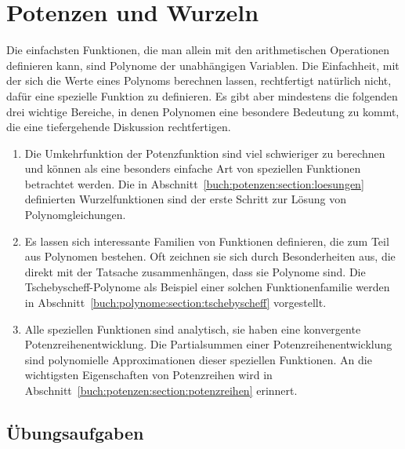 %
%
%
\chapter{Potenzen und Wurzeln
\label{buch:chapter:potenzen}}
Die einfachsten Funktionen, die man allein mit den arithmetischen
Operationen definieren kann, sind Polynome der unabhängigen Variablen.
Die Einfachheit, mit der sich die Werte eines Polynoms berechnen lassen,
rechtfertigt natürlich nicht, dafür eine spezielle Funktion zu definieren.
Es gibt aber mindestens die folgenden drei wichtige Bereiche, in denen
Polynomen eine besondere Bedeutung zu kommt, die eine tiefergehende
Diskussion rechtfertigen.
\begin{enumerate}
\item
Die Umkehrfunktion der Potenzfunktion sind viel schwieriger zu 
%
berechnen und können als eine besonders einfache Art von speziellen
Funktionen betrachtet werden.
Die in Abschnitt~\ref{buch:potenzen:section:loesungen} definierten
Wurzelfunktionen sind der erste Schritt zur Lösung von Polynomgleichungen.
%
%
\item
Es lassen sich interessante Familien von Funktionen
definieren, die zum Teil aus Polynomen bestehen.
Oft zeichnen sie sich durch Besonderheiten aus, die
direkt mit der Tatsache zusammenhängen, dass sie Polynome sind.
Die Tschebyscheff-Polynome als
Beispiel einer solchen Funktionenfamilie werden in
Abschnitt~\ref{buch:polynome:section:tschebyscheff} vorgestellt.
\item
Alle speziellen Funktionen sind analytisch, sie haben eine konvergente
Potenzreihenentwicklung.
%
Die Partialsummen einer Potenzreihenentwicklung sind polynomielle
Approximationen dieser speziellen Funktionen.
An die wichtigsten Eigenschaften von Potenzreihen wird in 
Abschnitt~\ref{buch:potenzen:section:potenzreihen} erinnert.
\end{enumerate}







\section*{Übungsaufgaben}
\begin{uebungsaufgaben}
\end{uebungsaufgaben}

